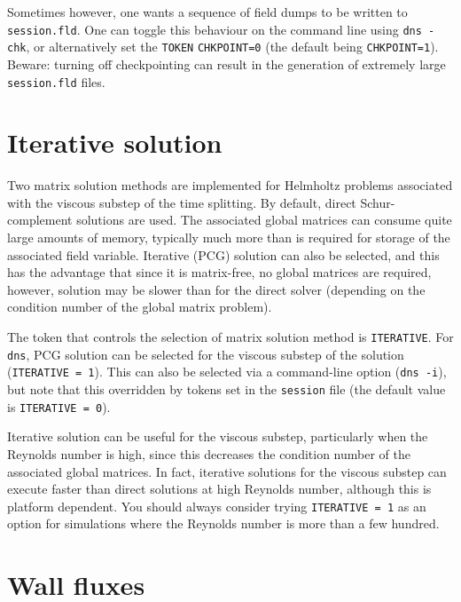 \documentclass[11pt]{report}
\begin{document}
Sometimes however, one wants a sequence of field dumps to be written
to \verb+session.fld+.  One can toggle this behaviour on the command
line using \verb+dns -chk+, or alternatively set the \verb+TOKEN+
\verb+CHKPOINT=0+ (the default being \verb+CHKPOINT=1+).  Beware:
turning off checkpointing can result in the generation of extremely
large \verb+session.fld+ files.

\section{Iterative solution}
\label{sec.iterative}

Two matrix solution methods are implemented for Helmholtz problems
associated with the viscous substep of the time splitting.  By
default, direct Schur-complement solutions are used.  The associated
global matrices can consume quite large amounts of memory, typically
much more than is required for storage of the associated field
variable.  Iterative (PCG) solution can also be selected, and this has
the advantage that since it is matrix-free, no global matrices are
required, however, solution may be slower than for the direct solver
(depending on the condition number of the global matrix problem).

The token that controls the selection of matrix solution method is
\verb+ITERATIVE+.  For \verb+dns+, PCG solution can be selected for
the viscous substep of the solution (\verb+ITERATIVE = 1+).  This can
also be selected via a command-line option (\verb+dns -i+), but note
that this overridden by tokens set in the \verb+session+ file (the
default value is \verb+ITERATIVE = 0+).

Iterative solution can be useful for the viscous substep, particularly
when the Reynolds number is high, since this decreases the condition
number of the associated global matrices.  In fact, iterative
solutions for the viscous substep can execute faster than direct
solutions at high Reynolds number, although this is platform
dependent. You should always consider trying \verb+ITERATIVE = 1+ as
an option for simulations where the Reynolds number is more than a few
hundred.

\section{Wall fluxes}
\label{sec.flux}
\end{document}
